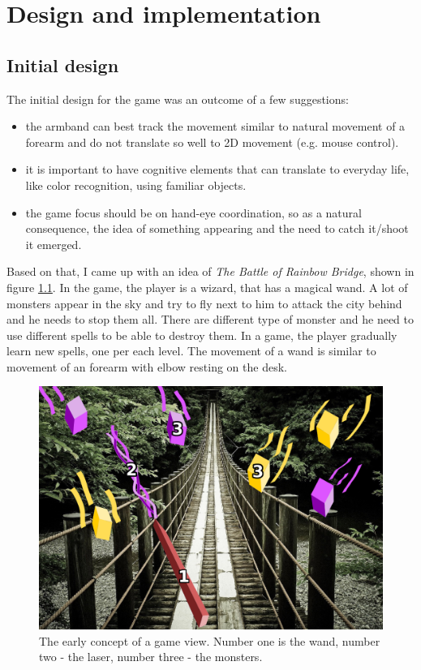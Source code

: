 \chapter{Design and implementation}

\section{Initial design}	
The initial design for the game was an outcome of a few suggestions:
\begin{itemize}
\item the armband can best track the movement similar to natural movement of a forearm and do not translate so well to 2D movement (e.g. mouse control).
\item it is important to have cognitive elements that can translate to everyday life, like color recognition, using familiar objects.
\item the game focus should be on hand-eye coordination, so as a natural consequence, the idea of something appearing and the need to catch it/shoot it emerged. 
\end{itemize}
Based on that, I came up with an idea of \emph{The Battle of Rainbow Bridge}, shown in figure \ref{fig:design}. In the game, the player is a wizard, that has a magical wand. A lot of monsters appear in the sky and try to fly next to him to attack the city behind and he needs to stop them all. There are different type of monster and he need to use different spells to be able to destroy them. In a game, the player gradually learn new spells, one per each level. The movement of a wand is similar to movement of an forearm with elbow resting on the desk. 

\begin{figure}
\includegraphics[width=\textwidth]{graphics/described_drawing.png} 
\caption{The early concept of a game view. Number one is the wand, number two - the laser, number three - the monsters.}
\label{fig:design}
\end{figure}

